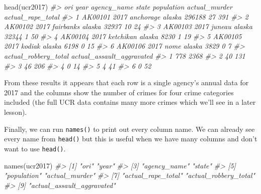 \documentclass[
  12pt,
]{book}
\newenvironment{Shaded}{\begin{snugshade}}{\end{snugshade}}
\newcommand{\CommentTok}[1]{\textcolor[rgb]{0.37,0.37,0.37}{\textit{#1}}}
\newcommand{\FunctionTok}[1]{\textcolor[rgb]{0,0,0}{#1}}
\newcommand{\NormalTok}[1]{#1}
\begin{document}
\begin{Shaded}
\begin{Highlighting}[]
\FunctionTok{head}\NormalTok{(ucr2017)}
\CommentTok{\#\textgreater{}       ori year agency\_name  state population actual\_murder actual\_rape\_total}
\CommentTok{\#\textgreater{} 1 AK00101 2017   anchorage alaska     296188            27               391}
\CommentTok{\#\textgreater{} 2 AK00102 2017   fairbanks alaska      32937            10                24}
\CommentTok{\#\textgreater{} 3 AK00103 2017      juneau alaska      32344             1                50}
\CommentTok{\#\textgreater{} 4 AK00104 2017   ketchikan alaska       8230             1                19}
\CommentTok{\#\textgreater{} 5 AK00105 2017      kodiak alaska       6198             0                15}
\CommentTok{\#\textgreater{} 6 AK00106 2017        nome alaska       3829             0                 7}
\CommentTok{\#\textgreater{}   actual\_robbery\_total actual\_assault\_aggravated}
\CommentTok{\#\textgreater{} 1                  778                      2368}
\CommentTok{\#\textgreater{} 2                   40                       131}
\CommentTok{\#\textgreater{} 3                   46                       206}
\CommentTok{\#\textgreater{} 4                    0                        14}
\CommentTok{\#\textgreater{} 5                    4                        41}
\CommentTok{\#\textgreater{} 6                    0                        52}
\end{Highlighting}
\end{Shaded}

From these results it appears that each row is a single agency's annual data for 2017 and the columns show the number of crimes for four crime categories included (the full UCR data contains many more crimes which we'll see in a later lesson).

Finally, we can run \texttt{names()} to print out every column name. We can already see every name from \texttt{head()} but this is useful when we have many columns and don't want to use \texttt{head()}.

\begin{Shaded}
\begin{Highlighting}[]
\FunctionTok{names}\NormalTok{(ucr2017)}
\CommentTok{\#\textgreater{} [1] "ori"                       "year"                     }
\CommentTok{\#\textgreater{} [3] "agency\_name"               "state"                    }
\CommentTok{\#\textgreater{} [5] "population"                "actual\_murder"            }
\CommentTok{\#\textgreater{} [7] "actual\_rape\_total"         "actual\_robbery\_total"     }
\CommentTok{\#\textgreater{} [9] "actual\_assault\_aggravated"}
\end{Highlighting}
\end{Shaded}
\end{document}
